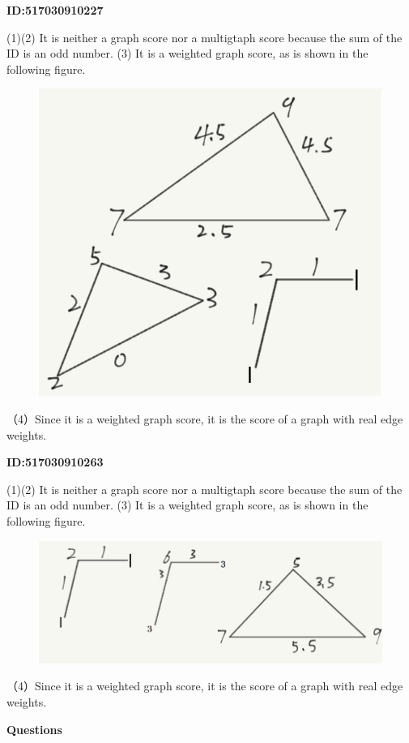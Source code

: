 \documentclass{article} %
\begin{document}
	\textbf{ID:517030910227}\par
	(1)(2) It is neither a graph score nor a multigtaph score because the sum of the ID is an odd number.
	(3) It is a weighted graph score, as is shown in the following figure.
	
	\begin{figure}[H]
		\centering
		\includegraphics[scale=0.6]{10227.png}
		\caption{}
		\label{fig:4}
	\end{figure}
	（4）Since it is a weighted graph score, it is the score of a graph with real edge weights.

	\textbf{ID:517030910263}\par
	(1)(2) It is neither a graph score nor a multigtaph score because the sum of the ID is an odd number.
	(3) It is a weighted graph score, as is shown in the following figure.
	
	\begin{figure}[H]
		\centering
		\includegraphics[scale=0.6]{10263.png}
		\caption{}
		\label{fig:5}
	\end{figure}
	（4）Since it is a weighted graph score, it is the score of a graph with real edge weights.

	\textbf{Questions}\par
	
\end{document}
